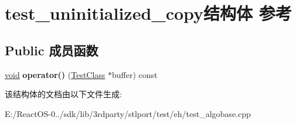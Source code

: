 \hypertarget{structtest__uninitialized__copy}{}\section{test\+\_\+uninitialized\+\_\+copy结构体 参考}
\label{structtest__uninitialized__copy}
\subsection*{Public 成员函数}
\begin{DoxyCompactItemize}
\item 
\mbox{\label{structtest__uninitialized__copy_aa16fe6346eff5ea0945007e6e993478d}} 
\hyperlink{interfacevoid}{void} {\bfseries operator()} (\hyperlink{class_test_class}{Test\+Class} $\ast$buffer) const
\end{DoxyCompactItemize}


该结构体的文档由以下文件生成\+:\begin{DoxyCompactItemize}
\item 
E\+:/\+React\+O\+S-\/0../sdk/lib/3rdparty/stlport/test/eh/test\+\_\+algobase.\+cpp\end{DoxyCompactItemize}

